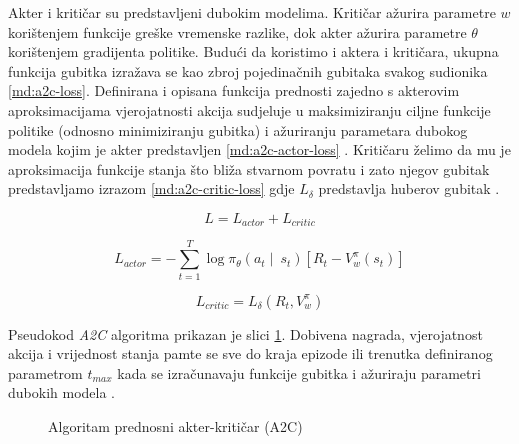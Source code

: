 \bigskip

Akter i kritičar su predstavljeni dubokim modelima. Kritičar ažurira parametre $w$ korištenjem funkcije greške vremenske razlike, dok akter ažurira parametre $\theta$ korištenjem gradijenta politike. Budući da koristimo i aktera i kritičara, ukupna funkcija gubitka izražava se kao zbroj pojedinačnih gubitaka svakog sudionika \ref{md:a2c-loss}. Definirana i opisana funkcija prednosti zajedno s akterovim aproksimacijama vjerojatnosti akcija sudjeluje u maksimiziranju ciljne funkcije politike (odnosno minimiziranju gubitka) i ažuriranju parametara dubokog modela kojim je akter predstavljen \ref{md:a2c-actor-loss} \cite{tensorflow}. Kritičaru želimo da mu je aproksimacija funkcije stanja što bliža stvarnom povratu i zato njegov gubitak predstavljamo izrazom \ref{md:a2c-critic-loss} gdje $L_\delta$ predstavlja huberov gubitak  \cite{tensorflow}.

\begin{equation}
    \label{md:a2c-loss}
    L = L_{actor} + L_{critic}
\end{equation}

\begin{equation}
    \label{md:a2c-actor-loss}
    L_{actor} = - \sum_{t=1}^{T}\log \pi_\theta (a_t \mid \ s_t) \left[ R_t - V_{w}^{\pi} (s_t) \right]
\end{equation}

\begin{equation}
    \label{md:a2c-critic-loss}
    L_{critic} = L_\delta(R_t, V_{w}^{\pi})
\end{equation}

\bigskip

Pseudokod \textit{A2C} algoritma prikazan je slici \ref{fig:a2c-algorithm}. Dobivena nagrada, vjerojatnost akcija i vrijednost stanja pamte se sve do kraja epizode ili trenutka definiranog parametrom $t_{max}$ kada se izračunavaju funkcije gubitka i ažuriraju parametri dubokih modela \cite{A2C}.

\begin{figure}[H]
    \centering
    \caption{Algoritam prednosni akter-kritičar (A2C) \cite{A2C}}
    \label{fig:a2c-algorithm}
\end{figure}
